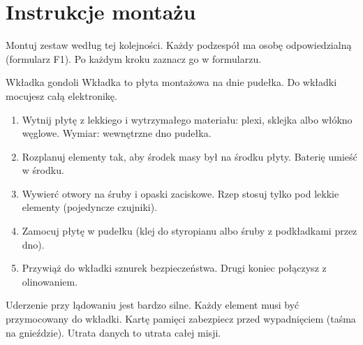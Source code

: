 \chapter{Instrukcje montażu}\label{ch:montaz}

Montuj zestaw według tej kolejności. Każdy podzespół ma osobę odpowiedzialną (formularz F1). Po każdym kroku zaznacz go w formularzu.

\begin{sekcja}{Wkładka gondoli}
Wkładka to płyta montażowa na dnie pudełka. Do wkładki mocujesz całą elektronikę.
\begin{enumerate}
  \item Wytnij płytę z lekkiego i wytrzymałego materiału: plexi, sklejka albo włókno węglowe. Wymiar: wewnętrzne dno pudełka.
  \item Rozplanuj elementy tak, aby środek masy był na środku płyty. Baterię umieść w środku.
  \item Wywierć otwory na śruby i opaski zaciskowe. Rzep stosuj tylko pod lekkie elementy (pojedyncze czujniki).
  \item Zamocuj płytę w pudełku (klej do styropianu albo śruby z podkładkami przez dno).
  \item Przywiąż do wkładki sznurek bezpieczeństwa. Drugi koniec połączysz z olinowaniem.
\end{enumerate}

\begin{uwaga}Uderzenie przy lądowaniu jest bardzo silne. Każdy element musi być przymocowany do wkładki. Kartę pamięci zabezpiecz przed wypadnięciem (taśma na gnieździe). Utrata danych to utrata całej misji.\end{uwaga}
\end{sekcja}

